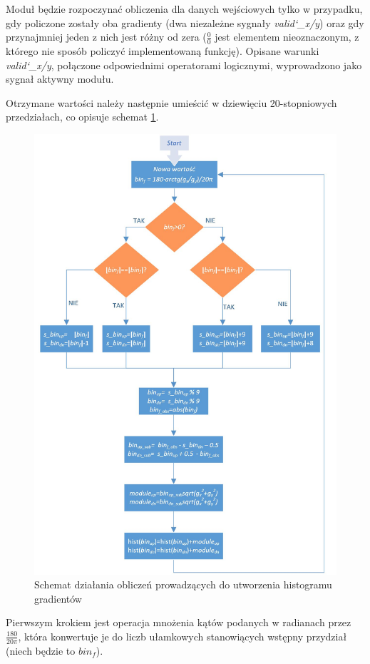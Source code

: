 Moduł będzie rozpoczynać obliczenia dla danych wejściowych tylko w przypadku, gdy policzone zostały oba gradienty (dwa niezależne sygnały \textit{valid\char`_x/y}) oraz gdy przynajmniej jeden z nich jest różny od zera ($\frac{0}{0}$ jest elementem nieoznaczonym, z którego nie sposób policzyć implementowaną funkcję). 
Opisane warunki \textit{valid\char`_x/y}, połączone odpowiednimi operatorami logicznymi, wyprowadzono jako sygnał aktywny modułu. %

Otrzymane wartości należy następnie umieścić w dziewięciu 20-stopniowych przedziałach, co opisuje schemat \ref{fig:hog_gradient}. 
\begin{figure}[!ht]
	\centering
	\includegraphics[width=12cm]{4_HOG_gradients.jpg}
	\caption{Schemat działania obliczeń prowadzących do utworzenia histogramu gradientów}
	\label{fig:hog_gradient}
\end{figure}
Pierwszym krokiem jest operacja mnożenia kątów podanych w radianach przez $\frac{180}{20\pi}$, która konwertuje je do liczb ułamkowych stanowiących wstępny przydział (niech będzie to $bin_f$).


